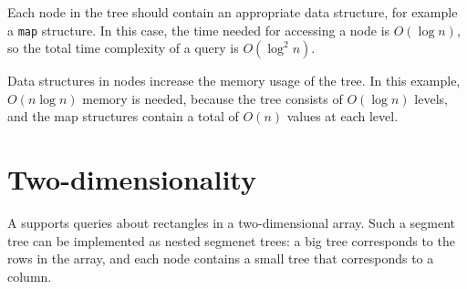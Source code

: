 Each node in the tree should contain
an appropriate data structure, for example a
\texttt{map} structure.
In this case, the time needed for accessing
a node is $O(\log n)$, so the total time complexity
of a query is $O(\log^2 n)$.

Data structures in nodes increase the memory usage
of the tree.
In this example, $O(n \log n)$ memory is needed,
because the tree consists of $O(\log n)$ levels,
and the map structures contain a total
of $O(n)$ values at each level.

\section{Two-dimensionality}


A  supports
queries about rectangles in a two-dimensional array.
Such a segment tree can be implemented as
nested segmenet trees: a big tree corresponds to the
rows in the array, and each node contains a small tree
that corresponds to a column.

